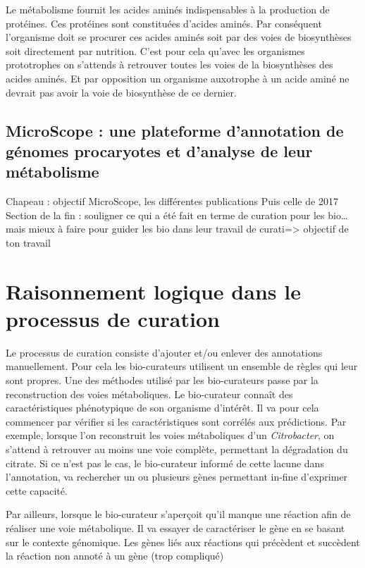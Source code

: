 \begin{refsegment}
    Le métabolisme fournit les acides aminés indispensables à la production de protéines. Ces protéines sont constituées d’acides aminés. Par conséquent l’organisme doit se procurer ces acides aminés soit par des voies de biosynthèses soit directement par nutrition. C’est pour cela qu’avec les organismes prototrophes on s’attends à retrouver toutes les voies de la biosynthèses des acides aminés. Et par opposition un organisme auxotrophe à un acide aminé ne devrait pas avoir la voie de biosynthèse de ce dernier.
    
    \subsection{MicroScope : une plateforme d’annotation de génomes procaryotes et d’analyse de leur métabolisme}
    
    Chapeau : objectif MicroScope, les différentes publications
    Puis celle de 2017
    Section de la fin : souligner ce qui a été fait en terme de curation pour les bio… mais mieux à faire pour guider les bio dans leur travail de curati=> objectif de ton travail
    
    

    \section{Raisonnement logique dans le processus de curation}
    
    Le processus de curation consiste d’ajouter et/ou enlever des annotations manuellement. Pour cela les bio-curateurs utilisent un ensemble de règles qui leur sont propres. Une des méthodes utilisé par les bio-curateurs passe par la reconstruction des voies métaboliques. Le bio-curateur connaît des caractéristiques phénotypique de son organisme d’intérêt. Il va pour cela commencer par vérifier si les caractéristiques sont corrélés aux prédictions. Par exemple, lorsque l’on reconstruit les voies métaboliques d’un \textit{Citrobacter}, on s’attend à retrouver au moins une voie complète, permettant la dégradation du citrate. Si ce n’est pas le cas, le bio-curateur informé de cette lacune dans l’annotation, va rechercher un ou plusieurs gènes permettant in-fine d’exprimer cette capacité.
    
    Par ailleurs, lorsque le bio-curateur s’aperçoit qu’il manque une réaction afin de réaliser une voie métabolique. Il va essayer de caractériser le gène en se basant sur le contexte génomique. Les gènes liés aux réactions qui précèdent et succèdent la réaction non annoté à un gène (trop compliqué)
    

\end{refsegment}
